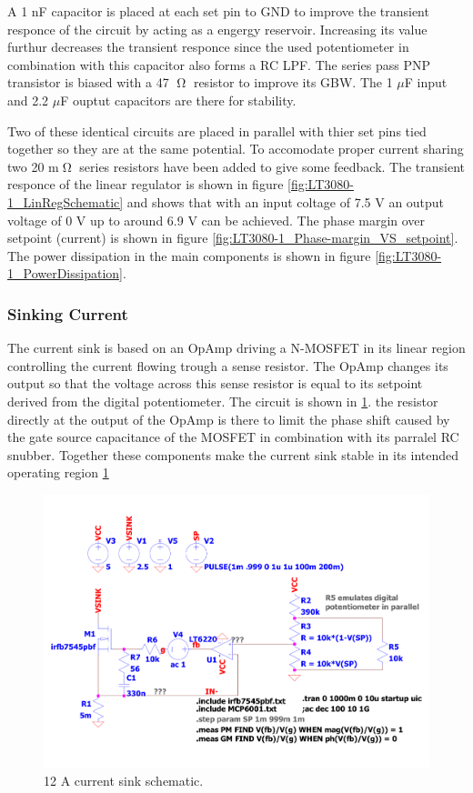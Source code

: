 A 1 nF capacitor is placed at each set pin to GND to improve the transient responce of the circuit by acting as a engergy reservoir. Increasing its value furthur decreases the transient responce since the used potentiometer in combination with this capacitor also forms a RC LPF. The series pass PNP transistor is biased with a 47 $\tcohm$ resistor to improve its GBW. The 1 $\mu$F input and 2.2 $\mu$F ouptut capacitors are there for stability.

Two of these identical circuits are placed in parallel with thier set pins tied together so they are at the same potential. To accomodate proper current sharing two 20 m$\tcohm$ series resistors have been added to give some feedback.
The transient responce of the linear regulator is shown in figure \ref{fig:LT3080-1_LinRegSchematic} and shows that with an input coltage of 7.5 V an output voltage of 0 V up to around 6.9 V can be achieved. The phase margin over setpoint (current) is shown in figure \ref{fig:LT3080-1_Phase-margin_VS_setpoint}. The power dissipation in the main components is shown in figure \ref{fig:LT3080-1_PowerDissipation}.

\subsubsection{Sinking Current}
The current sink is based on an OpAmp driving a N-MOSFET in its linear region controlling the current flowing trough a sense resistor. The OpAmp changes its output so that the voltage across this sense resistor is equal to its setpoint derived from the digital potentiometer. The circuit is shown in \ref{fig:CurrentSinkSchematic}. the resistor directly at the output of the OpAmp is there to limit the phase shift caused by the gate source capacitance of the MOSFET in combination with its parralel RC snubber. Together these components make the current sink stable in its intended operating region \ref{fig:CurrentSinkSchematic}

\begin{figure}[h!]
    \centering
    \includegraphics[scale=0.3]{CurrentSinkSchematic.pdf}
    \caption{12 A current sink schematic.}
    \label{fig:CurrentSinkSchematic}
\end{figure}

